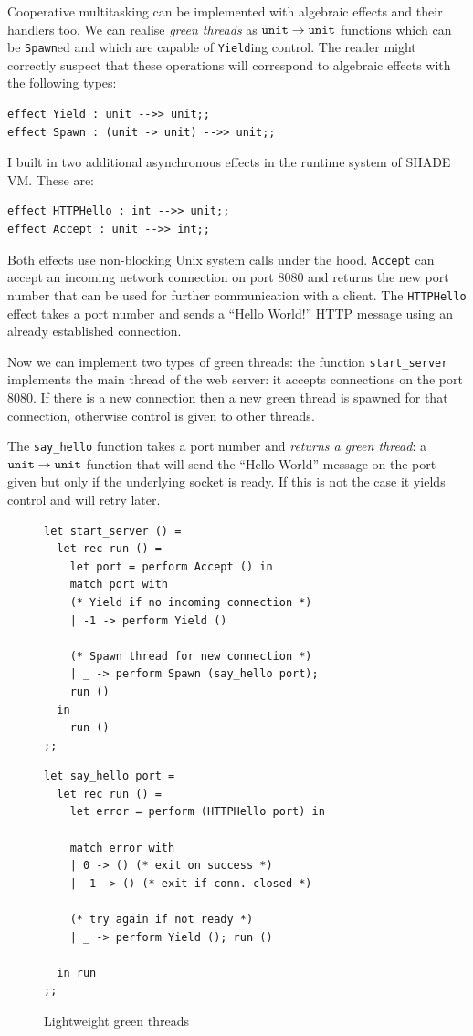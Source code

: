 \documentclass[class=article, crop=false]{standalone}
\begin{document}
Cooperative multitasking can be implemented with algebraic effects and their
handlers too. We can realise \emph{green threads} as $\mathtt{unit} \to \mathtt{unit}$
functions which can be \lstinline|Spawn|ed and which are capable
of \lstinline|Yield|ing control. The reader might correctly suspect that
these operations will correspond to algebraic effects with the following types:
\begin{verbatim}
effect Yield : unit -->> unit;;
effect Spawn : (unit -> unit) -->> unit;;
\end{verbatim}
I built in two additional asynchronous effects in the runtime system of SHADE VM.
These are:
\begin{verbatim}
effect HTTPHello : int -->> unit;;
effect Accept : unit -->> int;;
\end{verbatim}
Both effects use non-blocking Unix system calls under the hood.
\verb|Accept| can accept an incoming network connection on port 8080 and returns
the new port number that can be used for further communication with a client.
The \verb|HTTPHello| effect takes a port number and sends a ``Hello World!''
HTTP message using an already established connection.

Now we can implement two types of green threads: the function
\lstinline|start_server| implements the main thread of the web server: it
accepts connections on the port 8080. If there is a new connection then a new
green thread is spawned for that connection, otherwise control is given to other
threads.

The \lstinline{say_hello} function takes a port number and
\emph{returns a green thread}: a $\mathtt{unit} \to \mathtt{unit}$ function that will
send the ``Hello World'' message on the port given but only if the underlying
socket is ready. If this is not the case it yields control and will retry later.

\begin{figure}
\begin{minipage}{0.6\textwidth}
\begin{verbatim}
let start_server () =
  let rec run () =
    let port = perform Accept () in
    match port with
    (* Yield if no incoming connection *)
    | -1 -> perform Yield ()

    (* Spawn thread for new connection *)
    | _ -> perform Spawn (say_hello port);
    run ()
  in
    run ()
;;
\end{verbatim}
\end{minipage}%
\begin{minipage}{.4\textwidth}
\begin{verbatim}
let say_hello port =
  let rec run () =
    let error = perform (HTTPHello port) in
    
    match error with
    | 0 -> () (* exit on success *)
    | -1 -> () (* exit if conn. closed *)

    (* try again if not ready *)
    | _ -> perform Yield (); run ()

  in run
;;
\end{verbatim}
\end{minipage}
\caption{Lightweight green threads}
\label{fig:green-threads}
\end{figure}
\end{document}
